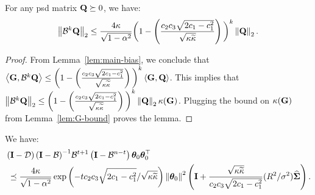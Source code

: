 \begin{lemma}\label{lem:B-contraction}
	For any psd matrix $\Q \succeq 0$, we have:
	\begin{align*}
		\twonorm{\B^k \Q} \leq \frac{4\cnH}{\sqrt{1-\alpha^2}}\bigg(1-\left(\frac{ \ctwo \cthree \sqrt{2\cone-\cone^2} }{\sqrt{\cnH\cnS}}\right)\bigg)^k \twonorm{\Q}.
	\end{align*}
\end{lemma}
\begin{proof}
	From Lemma~\ref{lem:main-bias}, we conclude that $\iprod{\G}{\B^k \Q} \leq \bigg(1-\left(\frac{ \ctwo \cthree \sqrt{2\cone-\cone^2} }{\sqrt{\cnH\cnS}}\right)\bigg)^k\iprod{\G}{\Q}$. This implies that $\twonorm{\B^k \Q} \leq \bigg(1-\left(\frac{ \ctwo \cthree \sqrt{2\cone-\cone^2} }{\sqrt{\cnH\cnS}}\right)\bigg)^k \twonorm{\Q} \kappa(\G)$. Plugging the bound on $\kappa(\G)$ from Lemma~\ref{lem:G-bound} proves the lemma.
\end{proof}
\begin{lemma}\label{lem:bias-bound}
	We have: %
	\begin{align*}
		&\left(\Id - \D\right) \inv{\left(\Id - \B \right)} \B^{t+1} \left(\Id - \B^{n-t}\right) \thetat[0]\thetat[0]\T \\ &\;\preceq \frac{4\cnH}{\sqrt{1-\alpha^2}} \exp\left(- t \ctwo \cthree \sqrt{2\cone - \cone^2}/\sqrt{\cnH\cnS}\right) \norm{\thetat[0]}^2 \left(\eye +  \frac{\sqrt{\cnH\cnS}}{\ctwo\cthree\sqrt{2\cone-\cone^2}} (\infbound/\sigma^2) \Sighat \right).
	\end{align*}
\end{lemma}
